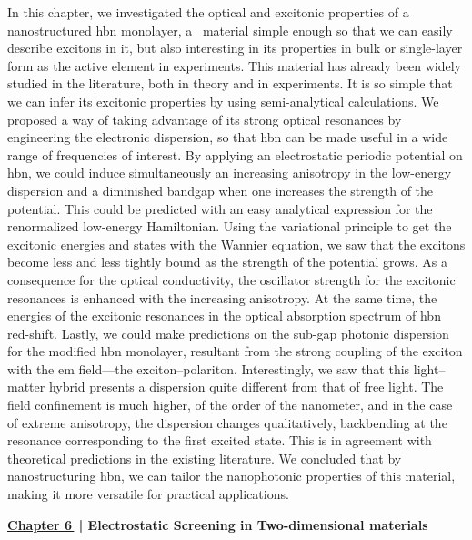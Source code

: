 In this chapter, we investigated the optical and excitonic properties of a nanostructured \gls{hbn} monolayer, a \bd~material simple enough so that we can easily describe excitons in it, but also interesting in its properties in bulk or single-layer form as the active element in experiments.
This material has already been widely studied in the literature, both in theory and in experiments.
It is so simple that we can infer its excitonic properties by using semi-analytical calculations.
We proposed a way of taking advantage of its strong optical resonances by engineering the electronic dispersion, so that \gls{hbn} can be made useful in a wide range of frequencies of interest.
By applying an electrostatic periodic potential on \gls{hbn}, we could induce simultaneously an increasing anisotropy in the low-energy dispersion and a diminished bandgap when one increases the strength of the potential.
This could be predicted with an easy analytical expression for the renormalized low-energy Hamiltonian.
Using the variational principle to get the excitonic energies and states with the Wannier equation, we saw that the excitons become less and less tightly bound as the strength of the potential grows.
As a consequence for the optical conductivity, the oscillator strength for the excitonic resonances is enhanced with the increasing anisotropy.
At the same time, the energies of the excitonic resonances in the optical absorption spectrum of \gls{hbn} red-shift.
Lastly, we could make predictions on the sub-gap photonic dispersion for the modified \gls{hbn} monolayer, resultant from the strong coupling of the exciton with the \gls{em} field---the exciton--polariton.
Interestingly, we saw that this light--matter hybrid presents a dispersion quite different from that of free light.
The field confinement is much higher, of the order of the nanometer, and in the case of extreme anisotropy, the dispersion changes qualitatively, backbending at the resonance corresponding to the first excited state.
This is in agreement with theoretical predictions in the existing literature.
We concluded that by nanostructuring \gls{hbn}, we can tailor the nanophotonic properties of this material, making it more versatile for practical applications.

\noindent
\textbf{\hyperref[ch:screening]{Chapter 6\,} \textcolor{black}{|} Electrostatic Screening in Two-dimensional materials}


